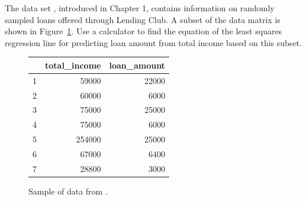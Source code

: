 \newpage

\begin{exercisewrap}
\begin{nexercise}\label{subsetOfLoan50}%
The data set , introduced in Chapter 1, contains information on randomly sampled loans offered through Lending Club.  A subset of the data matrix is shown in
Figure~\ref{data_for_regr_calc_exercise_loan50}.  Use a calculator to find the equation of the least squares regression line for predicting loan amount from total income based on this subset.\footnotemark 
\end{nexercise}
\end{exercisewrap}

\begin{figure}[ht]
\centering
\begin{tabular}{rrr}
  \hline
 & total\_income & loan\_amount \\ 
  \hline
1 & 59000 & 22000 \\ 
  2 & 60000 & 6000 \\ 
  3 & 75000 & 25000 \\ 
  4 & 75000 & 6000 \\ 
  5 & 254000 & 25000 \\ 
  6 & 67000 & 6400 \\ 
  7 & 28800 & 3000 \\ 
   \hline
\end{tabular}
\caption{Sample of data from .}
\label{data_for_regr_calc_exercise_loan50}
\end{figure}


